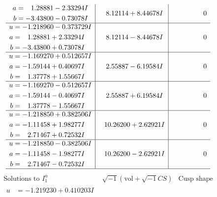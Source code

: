 \documentclass[1p]{elsarticle_modified}
\theoremstyle{definition}
\newcommand{\I}{\sqrt{-1}}
\begin{document}
$$\begin{array}{c|c|c}
\begin{aligned}
a &= \phantom{-}1.28881 - 2.33294 I \\
b &= -3.43800 - 0.73078 I\end{aligned}
 & \phantom{-}8.12114 + 8.44678 I & \phantom{-0.000000 } 0 \\ \hline\begin{aligned}
u &= -1.218960 - 0.373729 I \\
a &= \phantom{-}1.28881 + 2.33294 I \\
b &= -3.43800 + 0.73078 I\end{aligned}
 & \phantom{-}8.12114 - 8.44678 I & \phantom{-0.000000 } 0 \\ \hline\begin{aligned}
u &= -1.169270 + 0.512657 I \\
a &= -1.59144 + 0.40697 I \\
b &= \phantom{-}1.37778 + 1.55667 I\end{aligned}
 & \phantom{-}2.55887 - 6.19584 I & \phantom{-0.000000 } 0 \\ \hline\begin{aligned}
u &= -1.169270 - 0.512657 I \\
a &= -1.59144 - 0.40697 I \\
b &= \phantom{-}1.37778 - 1.55667 I\end{aligned}
 & \phantom{-}2.55887 + 6.19584 I & \phantom{-0.000000 } 0 \\ \hline\begin{aligned}
u &= -1.218850 + 0.382506 I \\
a &= -1.11458 + 1.98277 I \\
b &= \phantom{-}2.71467 + 0.72532 I\end{aligned}
 & \phantom{-}10.26200 + 2.62921 I & \phantom{-0.000000 } 0 \\ \hline\begin{aligned}
u &= -1.218850 - 0.382506 I \\
a &= -1.11458 - 1.98277 I \\
b &= \phantom{-}2.71467 - 0.72532 I\end{aligned}
 & \phantom{-}10.26200 - 2.62921 I & \phantom{-0.000000 } 0\\
 \hline 
 \end{array}$$\newpage$$\begin{array}{c|c|c}  
\text{Solutions to }I^u_{1}& \I (\text{vol} + \sqrt{-1}CS) & \text{Cusp shape}\\
 \hline 
\begin{aligned}
u &= -1.219230 + 0.410203 I \\

\end{aligned}
\end{array}$$
\end{document}
